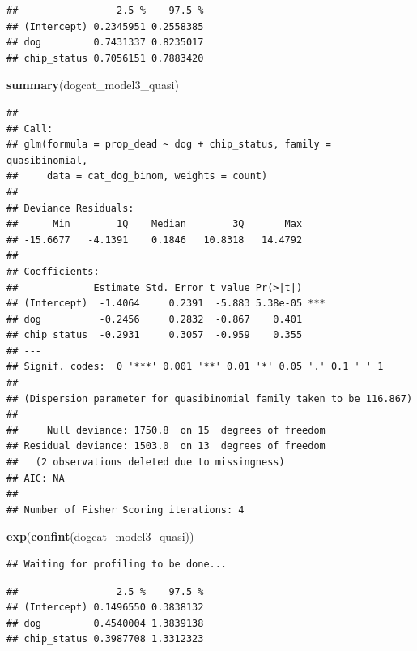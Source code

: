 \documentclass[]{article}
\newenvironment{Shaded}{\begin{snugshade}}{\end{snugshade}}
\newcommand{\KeywordTok}[1]{\textcolor[rgb]{0.13,0.29,0.53}{\textbf{#1}}}
\newcommand{\NormalTok}[1]{#1}
\begin{document}
\begin{verbatim}
##                 2.5 %    97.5 %
## (Intercept) 0.2345951 0.2558385
## dog         0.7431337 0.8235017
## chip_status 0.7056151 0.7883420
\end{verbatim}

\begin{Shaded}
\begin{Highlighting}[]
\KeywordTok{summary}\NormalTok{(dogcat_model3_quasi)}
\end{Highlighting}
\end{Shaded}

\begin{verbatim}
## 
## Call:
## glm(formula = prop_dead ~ dog + chip_status, family = quasibinomial, 
##     data = cat_dog_binom, weights = count)
## 
## Deviance Residuals: 
##      Min        1Q    Median        3Q       Max  
## -15.6677   -4.1391    0.1846   10.8318   14.4792  
## 
## Coefficients:
##             Estimate Std. Error t value Pr(>|t|)    
## (Intercept)  -1.4064     0.2391  -5.883 5.38e-05 ***
## dog          -0.2456     0.2832  -0.867    0.401    
## chip_status  -0.2931     0.3057  -0.959    0.355    
## ---
## Signif. codes:  0 '***' 0.001 '**' 0.01 '*' 0.05 '.' 0.1 ' ' 1
## 
## (Dispersion parameter for quasibinomial family taken to be 116.867)
## 
##     Null deviance: 1750.8  on 15  degrees of freedom
## Residual deviance: 1503.0  on 13  degrees of freedom
##   (2 observations deleted due to missingness)
## AIC: NA
## 
## Number of Fisher Scoring iterations: 4
\end{verbatim}

\begin{Shaded}
\begin{Highlighting}[]
\KeywordTok{exp}\NormalTok{(}\KeywordTok{confint}\NormalTok{(dogcat_model3_quasi))}
\end{Highlighting}
\end{Shaded}

\begin{verbatim}
## Waiting for profiling to be done...
\end{verbatim}

\begin{verbatim}
##                 2.5 %    97.5 %
## (Intercept) 0.1496550 0.3838132
## dog         0.4540004 1.3839138
## chip_status 0.3987708 1.3312323
\end{verbatim}
\end{document}
